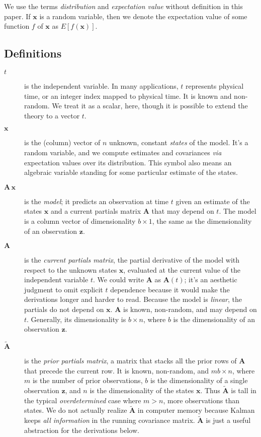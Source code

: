 \documentclass[10pt,oneside,x11names]{article}
\begin{document}
We use the terms \emph{distribution} and \emph{expectation value} without definition in
this paper. If \(\mathbold{x}\) is a random variable, then we denote the
expectation value of some function \(f\) of \(\mathbold{x}\) as \(E[f(\mathbold{x})]\).

\subsection{Definitions}
\label{sec:orgheadline5}

\begin{description}
\item[{\(t\)}] is the independent variable. In many applications, \(t\) represents physical
time, or an integer index mapped to physical time. It is known and
non-random. We treat it as a scalar, here, though it is possible to extend
the theory to a vector \(t\).

\item[{\(\mathbold{x}\)}] is the (column) vector of \(n\) unknown, constant \emph{states}
of the model. It's a random variable, and we compute estimates and
covariances \emph{via} expectation values over its distribution. This symbol
also means an algebraic variable standing for some particular estimate of
the states.

\item[{\(\mathbold{A}\,\mathbold{x}\)}] is the \emph{model}; it predicts an observation at
time \(t\) given an estimate of the states \(\mathbold{x}\) and a current
partials matrix \(\mathbold{A}\) that may depend on \(t\). The model is a
column vector of dimensionality \(b\times{1}\), the same as the dimensionality of an
observation \(\mathbold{z}\).

\item[{\(\mathbold{A}\)}] is the \emph{current partials matrix}, the partial derivative of
the model with respect to the unknown states \(\mathbold{x}\), evaluated
at the current value of the independent variable \(t\). We could write
\(\mathbold{A}\) as \(\mathbold{A}(t)\); it's an
aesthetic judgment to omit explicit \(t\) dependence because it
would make the derivations longer and harder to read.  Because the
model is \emph{linear}, the partials do not depend on \(\mathbold{x}\). 
\(\mathbold{A}\) is known, non-random, and may depend on \(t\). Generally,
its dimensionality
is \(b\times{n}\), where \(b\) is the dimensionality of an 
observation \(\mathbold{z}\).

\item[{\(\tilde{\mathbold{A}}\)}] is the \emph{prior partials matrix}, a matrix that stacks
all the prior rows of \(\mathbold{A}\) that precede the current row. It is
known, non-random, and \(m b\times{n}\), where \(m\) is the number of prior
observations, \(b\) is the dimensionality of a single
observation \(\mathbold{z}\), and \(n\) is the dimensionality of the states
\(\mathbold{x}\).  Thus
\(\tilde{\mathbold{A}}\) is tall in the typical \emph{overdetermined} case where
\(m>n\), more observations than states. We do not actually
realize \(\tilde{\mathbold{A}}\) in computer memory because Kalman keeps
\emph{all information} in the running covariance matrix. \(\tilde{\mathbold{A}}\)
is just a
useful abstraction for the derivations below.


\end{description}
\end{document}
